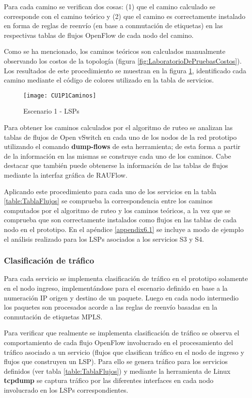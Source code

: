 Para cada camino se verifican dos cosas: (1) que el camino calculado se corresponde con el camino te\'orico y (2) que el camino es correctamente instalado en forma de reglas de reenvío (en base a conmutaci\'on de etiquetas) en las respectivas tablas de flujos OpenFlow de cada nodo del camino.

Como se ha mencionado, los caminos te\'oricos son calculados manualmente observando los costos de la topolog\'ia (figura \ref{fig:LaboratorioDePruebasCostos}). Los resultados de este procedimiento se muestran en la figura \ref{fig:CUP1Caminos}, identificado cada camino mediante el código de colores utilizado en la tabla de servicios.

\begin{figure}[ht!] 
\centering    
\texttt{[image: CU1P1Caminos]}
\caption[Escenario 1 - LSPs]{Escenario 1 - LSPs}
\label{fig:CUP1Caminos}
\end{figure}

Para obtener los caminos calculados por el algoritmo de ruteo se analizan las tablas de flujos de Open vSwitch en cada uno de los nodos de la red prototipo utilizando el comando \textbf{dump-flows} de esta herramienta; de esta forma a partir de la informaci\'on en las mismas se construye cada uno de los caminos. Cabe destacar que tambi\'en puede obtenerse la informaci\'on de las tablas de flujos mediante la interfaz gráfica de RAUFlow.

Aplicando este procedimiento para cada uno de los servicios en la tabla \ref{table:TablaFlujos} se comprueba la correspondencia entre los caminos computados por el algoritmo de ruteo y los caminos te\'oricos, a la vez que se comprueba que son correctamente instalados como flujos en las tablas de cada nodo en el prototipo. En el apéndice \ref{appendix6.1} se incluye a modo de ejemplo el análisis realizado para los LSPs asociados a los servicios S3 y S4.
 
\subsubsection{Clasificaci\'on de tr\'afico}
Para cada servicio se implementa clasificaci\'on de tr\'afico en el prototipo solamente en el nodo ingreso, implementándose para el escenario definido en base a la numeraci\'on IP origen y destino de un paquete. Luego en cada nodo intermedio los paquetes son procesados acorde a las reglas de reenvío basadas en la conmutación de etiquetas MPLS.

Para verificar que realmente se implementa clasificaci\'on de tr\'afico se observa el comportamiento de cada flujo OpenFlow involucrado en el procesamiento del tr\'afico asociado a un servicio (flujos que clasifican tr\'afico en el nodo de ingreso y flujos que construyen un LSP). Para ello se genera tr\'afico para los servicios definidos (ver tabla \ref{table:TablaFlujos}) y mediante la herramienta de Linux \textbf{tcpdump} se captura tr\'afico por las diferentes interfaces en cada nodo involucrado en los LSPs correspondientes. 

